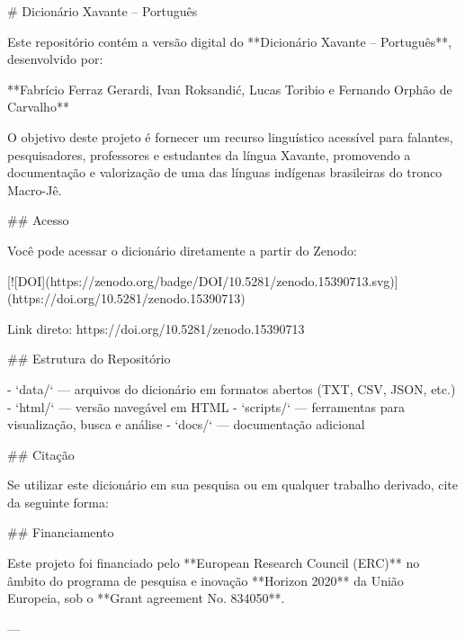 # Dicionário Xavante – Português

Este repositório contém a versão digital do **Dicionário Xavante – Português**, desenvolvido por:

**Fabrício Ferraz Gerardi, Ivan Roksandić, Lucas Toribio e Fernando Orphão de Carvalho**

O objetivo deste projeto é fornecer um recurso linguístico acessível para falantes, pesquisadores, professores e estudantes da língua Xavante, promovendo a documentação e valorização de uma das línguas indígenas brasileiras do tronco Macro-Jê.

## Acesso

Você pode acessar o dicionário diretamente a partir do Zenodo:

[![DOI](https://zenodo.org/badge/DOI/10.5281/zenodo.15390713.svg)](https://doi.org/10.5281/zenodo.15390713)

Link direto: https://doi.org/10.5281/zenodo.15390713

## Estrutura do Repositório

- `data/` — arquivos do dicionário em formatos abertos (TXT, CSV, JSON, etc.)
- `html/` — versão navegável em HTML
- `scripts/` — ferramentas para visualização, busca e análise
- `docs/` — documentação adicional

## Citação

Se utilizar este dicionário em sua pesquisa ou em qualquer trabalho derivado, cite da seguinte forma:

## Financiamento

Este projeto foi financiado pelo **European Research Council (ERC)** no âmbito do programa de pesquisa e inovação **Horizon 2020** da União Europeia, sob o **Grant agreement No. 834050**.

---
  

